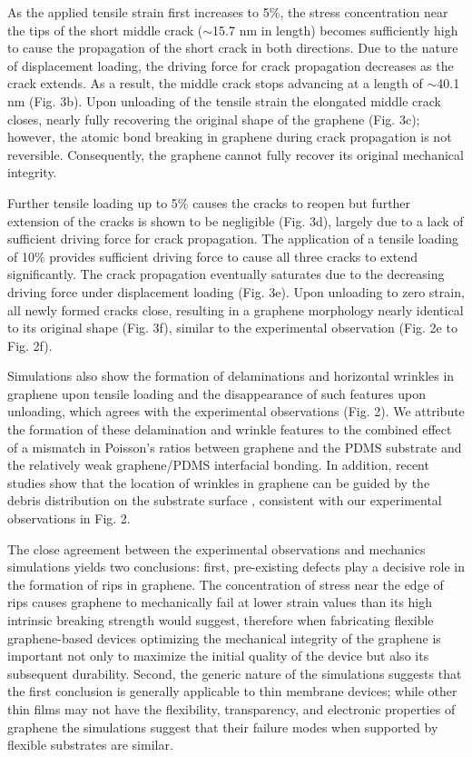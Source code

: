 \documentclass[%
 aps,
 pra,
 longbibliography,
 amsmath,amssymb,
 reprint,
 superscriptaddress,
]{revtex4-1}
\begin{document}
As the applied tensile strain first increases to 5\%, the stress concentration
near the tips of the short middle crack ($\sim$15.7 nm in length) becomes
sufficiently high to cause the propagation of the short crack in both
directions. Due to the nature of displacement loading, the driving force for
crack propagation decreases as the crack extends. As a result, the middle crack
stops advancing at a length of $\sim$40.1 nm (Fig. 3b). Upon unloading of the
tensile strain the elongated middle crack closes, nearly fully recovering the
original shape of the graphene (Fig. 3c); however, the atomic bond breaking in
graphene during crack propagation is not reversible. Consequently, the graphene
cannot fully recover its original mechanical integrity.

Further tensile loading up to 5\% causes the cracks to reopen but further
extension of the cracks is shown to be negligible (Fig. 3d), largely due to a
lack of sufficient driving force for crack propagation. The application of a
tensile loading of 10\% provides sufficient driving force to cause all three
cracks to extend significantly. The crack propagation eventually saturates due
to the decreasing driving force under displacement loading (Fig. 3e). Upon
unloading to zero strain, all newly formed cracks close, resulting in a
graphene morphology nearly identical to its original shape (Fig. 3f), similar
to the experimental observation (Fig. 2e to Fig. 2f).

Simulations also show the formation of delaminations and horizontal wrinkles in
graphene upon tensile loading and the disappearance of such features upon
unloading, which agrees with the experimental observations (Fig. 2). We
attribute the formation of these delamination and wrinkle features to the
combined effect of a mismatch in Poisson's ratios between graphene and the PDMS
substrate and the relatively weak graphene/PDMS interfacial bonding. In
addition, recent studies show that the location of wrinkles in graphene can be
guided by the debris distribution on the substrate surface \cite{Zhu2014b},
consistent with our experimental observations in Fig. 2.

The close agreement between the experimental observations and mechanics
simulations yields two conclusions: first, pre-existing defects play a decisive
role in the formation of rips in graphene. The concentration of stress near the
edge of rips causes graphene to mechanically fail at lower strain values than
its high intrinsic breaking strength would suggest, therefore when fabricating
flexible graphene-based devices optimizing the mechanical integrity of the
graphene is important not only to maximize the initial quality of the device
but also its subsequent durability. Second, the generic nature of the
simulations suggests that the first conclusion is generally applicable to thin
membrane devices; while other thin films may not have the flexibility,
transparency, and electronic properties of graphene the simulations suggest
that their failure modes when supported by flexible substrates are similar.
\end{document}
